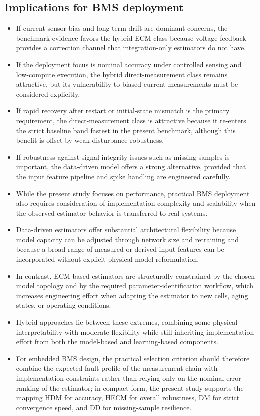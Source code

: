 \documentclass[review]{elsarticle}
\begin{document}
\subsection{Implications for BMS deployment}
\begin{itemize}[leftmargin=*]
    \item If current-sensor bias and long-term drift are dominant concerns, the benchmark evidence favors the hybrid ECM class because voltage feedback provides a correction channel that integration-only estimators do not have.
    \item If the deployment focus is nominal accuracy under controlled sensing and low-compute execution, the hybrid direct-measurement class remains attractive, but its vulnerability to biased current measurements must be considered explicitly.
    \item If rapid recovery after restart or initial-state mismatch is the primary requirement, the direct-measurement class is attractive because it re-enters the strict baseline band fastest in the present benchmark, although this benefit is offset by weak disturbance robustness.
    \item If robustness against signal-integrity issues such as missing samples is important, the data-driven model offers a strong alternative, provided that the input feature pipeline and spike handling are engineered carefully.
    \item While the present study focuses on performance, practical BMS deployment also requires consideration of implementation complexity and scalability when the observed estimator behavior is transferred to real systems.
    \item Data-driven estimators offer substantial architectural flexibility because model capacity can be adjusted through network size and retraining and because a broad range of measured or derived input features can be incorporated without explicit physical model reformulation.
    \item In contrast, ECM-based estimators are structurally constrained by the chosen model topology and by the required parameter-identification workflow, which increases engineering effort when adapting the estimator to new cells, aging states, or operating conditions.
    \item Hybrid approaches lie between these extremes, combining some physical interpretability with moderate flexibility while still inheriting implementation effort from both the model-based and learning-based components.
    \item For embedded BMS design, the practical selection criterion should therefore combine the expected fault profile of the measurement chain with implementation constraints rather than relying only on the nominal error ranking of the estimator; in compact form, the present study supports the mapping HDM for accuracy, HECM for overall robustness, DM for strict convergence speed, and DD for missing-sample resilience.
\end{itemize}
\end{document}
